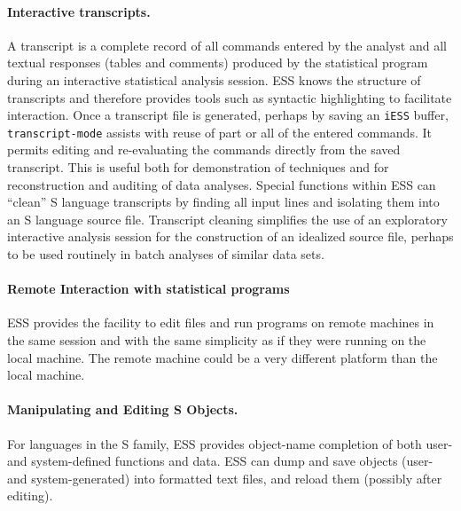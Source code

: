 \documentclass{article}
\newcommand{\stexttt}[1]{{\small\texttt{#1}}}
\begin{document}
\begin{enumerate}

\end{enumerate}

\paragraph{Interactive transcripts.}
A transcript is a complete record of all commands entered by the
analyst and all textual responses (tables and comments) produced by
the statistical program during an interactive statistical analysis
session.  ESS knows the structure of transcripts and therefore
provides tools such as syntactic highlighting to facilitate
interaction.
Once a transcript file is generated, perhaps by saving an
\stexttt{iESS} buffer, \stexttt{transcript-mode} assists with reuse of
part or all of the entered commands.  It permits editing and
re-evaluating the commands directly from the saved transcript.  This
is useful both for demonstration of techniques and for reconstruction
and auditing of data analyses.  Special functions within ESS can
``clean'' S language transcripts by finding all input lines and
isolating them into an S language source file.  Transcript cleaning
simplifies the use of an exploratory interactive analysis session for
the construction of an idealized source file, perhaps to be used
routinely in batch analyses of similar data sets.

\paragraph{Remote Interaction with statistical programs}%
ESS provides the facility to edit files and run programs on remote
machines in the same session and with the same simplicity as if they
were running on the local machine.  The remote machine could be a very
different platform than the local machine.

\paragraph{Manipulating and Editing S Objects.}
For languages in the S family, ESS provides object-name completion of
both user- and system-defined functions and data.  ESS can dump and
save objects (user- and system-generated) into formatted text files,
and reload them (possibly after editing).
\end{document}
